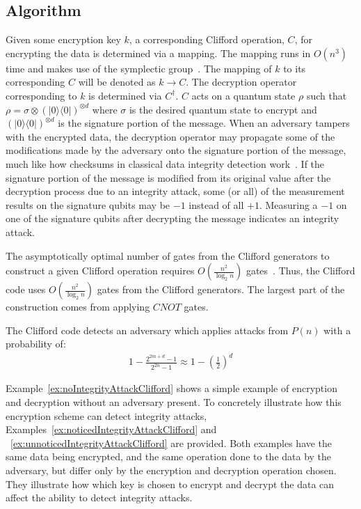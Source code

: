 \subsection{Algorithm}
Given some encryption key $k$, a corresponding Clifford operation, $C$, for encrypting the data is determined via a mapping. The mapping runs in $O \left(n^3 \right)$ time and makes use of the symplectic group~\cite{Koenig2014}. The mapping of $k$ to its corresponding $C$ will be denoted as $k \rightarrow C$. The decryption operator corresponding to $k$ is determined via $C^{\dagger}$. $C$ acts on a quantum state $\rho$ such that $\rho = \sigma \otimes (|0\rangle \langle0|)^{\otimes d}$ where $\sigma$ is the desired quantum state to encrypt and $(|0\rangle \langle0|)^{\otimes d}$ is the signature portion of the message. When an adversary tampers with the encrypted data, the decryption operator may propagate some of the modifications made by the adversary onto the signature portion of the message, much like how checksums in classical data integrity detection work~\cite{checksumWikipedia}. If the signature portion of the message is modified from its original value after the decryption process due to an integrity attack, some (or all) of the measurement results on the signature qubits may be $-1$ instead of all $+1$. Measuring a $-1$ on one of the signature qubits after decrypting the message indicates an integrity attack.

The asymptotically optimal number of gates from the Clifford generators to construct a given Clifford operation requires $O\left(\frac{n^2}{\log_2 n} \right)$ gates~\cite{bravyi2021hadamard,patel2008optimal}. Thus, the Clifford code uses $O \left(\frac{n^2}{\log_2 n} \right)$ gates from the Clifford generators. The largest part of the construction comes from applying $\mathit{CNOT}$ gates.

The Clifford code detects an adversary which applies attacks from $P(n)$ with a probability of:
\begin{align}
1-\frac{2^{2 m+d}-1}{2^{2 n}-1} \approx 1-\left(\frac{1}{2}\right)^{d} \label{eq:CliffordCodeProbabilityOfDetection}
\end{align}

Example~\ref{ex:noIntegrityAttackClifford} shows a simple example of encryption and decryption without an adversary present. To concretely illustrate how this encryption scheme can detect integrity attacks, Examples~\ref{ex:noticedIntegrityAttackClifford} and ~\ref{ex:unnoticedIntegrityAttackClifford} are provided. Both examples have the same data being encrypted, and the same operation done to the data by the adversary, but differ only by the encryption and decryption operation chosen. They illustrate how which key is chosen to encrypt and decrypt the data can affect the ability to detect integrity attacks.

